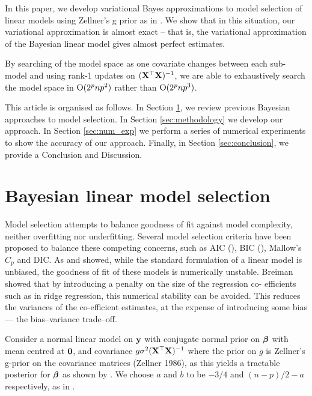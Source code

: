 \documentclass{amsart}[12pt]
\begin{document}


In this paper, we develop variational Bayes approximations to model selection of linear models using
Zellner's g prior as in \cite{Liang2008}. We show that in this situation, our variational approximation
is almost exact -- that is, the variational approximation of the Bayesian linear model gives almost perfect
estimates.

By searching of the model space as one covariate changes between each sub-model and  using rank-1 updates on
$({\bf X}^\top {\bf X})^{-1}$, we are able to exhaustively search the model space in $\text{O}(2^p np^2)$ rather than
$\text{O}(2^p np^3)$.

This article is organised as follows. In Section \ref{sec:model_selection}, we review previous Bayesian
approaches to model selection. In Section \ref{sec:methodology} we develop our approach. In Section
\ref{sec:num_exp} we perform a series of numerical experiments to show the accuracy of our approach. Finally,
in Section \ref{sec:conclusion}, we provide a Conclusion and Discussion.

\section{Bayesian linear model selection}
\label{sec:model_selection}

Model selection attempts to balance goodness of fit against model complexity, neither overfitting nor
underfitting. Several model selection criteria have been proposed to balance these competing concerns, such as
AIC (\cite{DeLeeuw1992}), BIC (\cite{Schwarz1978}), Mallow's $C_p$ and DIC. As \cite{Breiman1996} and
\cite{Efron2013} showed, while  the standard formulation of a linear model is unbiased, the goodness of fit of
these models is numerically  unstable. Breiman showed that by introducing a penalty on the size of the
regression co- efficients such as  in ridge regression, this numerical stability can be avoided. This reduces
the variances of the co-efficient estimates, at the expense of introducing some bias --- the bias--variance
trade--off.

Consider a normal linear model on ${\bf y}$ with conjugate normal prior on ${\boldsymbol \beta}$ with mean centred at ${\bf 0}$,
and covariance $g \sigma^2 ({\bf X}^\top {\bf X})^{-1}$ where the prior on $g$ is Zellner's g-prior on the covariance
matrices (Zellner 1986), as this yields a tractable posterior for ${\boldsymbol \beta}$ as shown by \cite{Liang2008}. We choose $a$  and $b$ to be $-3/4$ and $(n - p)/2 - a$ respectively, as in \cite{Maruyama2011}.
\end{document}
